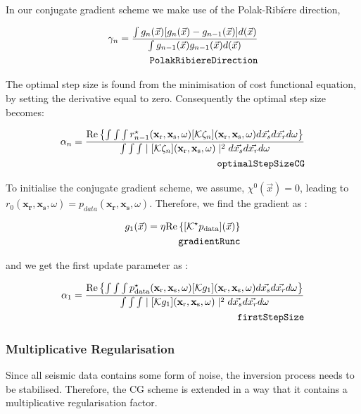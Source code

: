 \documentclass[10pt,a4paper]{article}
\newcommand{\real}[1]{\text{Re} \left\{ #1 \right\}}
\begin{document}
In our conjugate gradient scheme we make use of the
Polak-Ribi$\grave{e}$re direction,

\begin{align} \label{eq:PolakRibiereDirection} \gamma_n = \frac{\int
g_n(\vec{x})[g_n(\vec{x})-g_{n-1}(\vec{x})]d(\vec{x})}{\int
g_{n-1}(\vec{x}) g_{n-1}(\vec{x})d(\vec{x})}\\
\tag*{\texttt{PolakRibiereDirection}}
\end{align}

The optimal step size is found from the minimisation of cost
functional equation, by setting the derivative equal to zero.
Consequently the optimal step size becomes:

\begin{align} \label{eq:optimalStepSizeCG} \alpha_n = \frac {\real {\int \int
\int r^{\star}_{n-1}(\mathbf{x_\text{r}},\mathbf{x_\text{s}},\omega)[\mathcal{K}
\zeta_n](\mathbf{x_\text{r}},\mathbf{x_\text{s}},\omega)d\vec{x_s}d\vec{x_r}d\omega}}{\int
\int \int \mid[\mathcal{K}
\zeta_n](\mathbf{x_\text{r}},\mathbf{x_\text{s}},\omega) \mid^2
d\vec{x_s}d\vec{x_r}d\omega}\\
\tag*{\texttt{optimalStepSizeCG}}
\end{align}

To initialise the conjugate gradient scheme, we assume, $\chi^0
(\vec{x}) = 0$, leading to
$r_0(\mathbf{x_\text{r}},\mathbf{x_\text{s}},\omega) =
p_{data}(\mathbf{x_\text{r}},\mathbf{x_\text{s}},\omega)$.
Therefore, we find the gradient as :

\begin{align} \label{eq:gradientFunc} g_1(\vec{x}) = \eta
\real{[\mathcal{K}^\star p_\text{data}](\vec{x})}\\
\tag*{\texttt{gradientRunc}}
\end{align}

and we get the first update parameter as :

\begin{align} \label{eq:firstStepSize} \alpha_1 = \frac {\real {\int \int
\int p^{\star}_\text{data}(\mathbf{x_\text{r}},\mathbf{x_\text{s}},\omega)[\mathcal{K}
g_1](\mathbf{x_\text{r}},\mathbf{x_\text{s}},\omega)d\vec{x_s}d\vec{x_r}d\omega}}{\int
\int \int \mid[\mathcal{K}
g_1](\mathbf{x_\text{r}},\mathbf{x_\text{s}},\omega) \mid^2
d\vec{x_s}d\vec{x_r}d\omega}\\
\tag*{\texttt{firstStepSize}}
\end{align}


\subsubsection{Multiplicative Regularisation}
\label{multreg}
Since all seismic data contains some form of noise, the inversion
process needs to be stabilised. Therefore, the CG scheme is extended
in a way that it contains a multiplicative regularisation factor.
\end{document}
